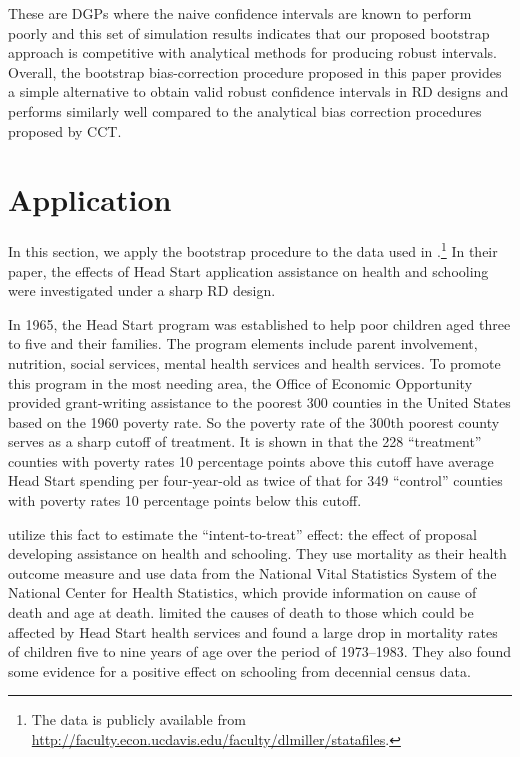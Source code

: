 \documentclass[12pt,fleqn]{article}
\begin{document}
These are DGPs where the naive confidence intervals are known to perform poorly
and this set of simulation results indicates that our proposed bootstrap approach is 
competitive with analytical methods for producing robust intervals.
Overall, the bootstrap bias-correction procedure proposed in this paper provides a simple alternative to obtain valid robust confidence intervals in RD designs
and performs similarly well compared to the analytical bias correction procedures proposed by CCT.


\section{Application}\label{application}

In this section, we apply the bootstrap procedure to the data used in
\cite{ludwig2007}.\footnote{%
  The data is publicly available from
  \url{http://faculty.econ.ucdavis.edu/faculty/dlmiller/statafiles}.} %
In their paper, the effects of Head Start application assistance on health and
schooling were investigated under a sharp RD design.

In 1965, the Head Start program was established to help poor children aged three
to five and their families. The program elements include parent involvement,
nutrition, social services, mental health services and health services. To
promote this program in the most needing area, the Office of Economic
Opportunity provided grant-writing assistance to the poorest 300 counties in the
United States based on the 1960 poverty rate. So the poverty rate of the 300th
poorest county serves as a sharp cutoff of treatment. It is shown in
\cite{ludwig2007} that the 228 ``treatment'' counties with poverty rates 10
percentage points above this cutoff have average Head Start spending per
four-year-old as twice of that for 349 ``control'' counties with poverty rates
10 percentage points below this cutoff.

\cite{ludwig2007} utilize this fact to estimate the ``intent-to-treat'' effect:
the effect of proposal developing assistance on health and schooling. They use
mortality as their health outcome measure and use data from the National Vital
Statistics System of the National Center for Health Statistics, which provide
information on cause of death and age at death. \cite{ludwig2007} limited the
causes of death to those which could be affected by Head Start health services
and found a large drop in mortality rates of children five to nine years of age
over the period of 1973--1983. They also found some evidence for a positive
effect on schooling from decennial census data.
\end{document}
